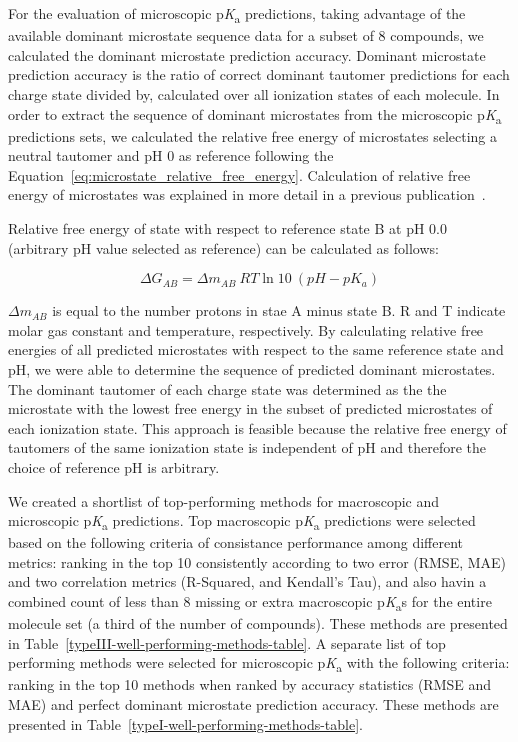 \documentclass[9pt,lineno,final]{elife}
\newcommand{\pKa}{p\textit{K}\textsubscript{a}}
\begin{document}
For the evaluation of microscopic \pKa{} predictions, taking advantage of the available dominant microstate sequence data for a subset of 8 compounds, we calculated the dominant microstate prediction accuracy. Dominant microstate prediction accuracy is the ratio of correct dominant tautomer predictions for each charge state divided by, calculated over all ionization states of each molecule. 
In order to extract the sequence of dominant microstates from the microscopic \pKa{} predictions sets, we calculated the relative free energy of microstates selecting a neutral tautomer and pH 0 as reference following the Equation~\ref{eq:microstate_relative_free_energy}. Calculation of relative free energy of microstates was explained in more detail in a previous publication~\citep{Gunner:2020:J.Comput.AidedMol.Des.}. 

Relative free energy of state with respect to reference state B at pH 0.0 (arbitrary pH value selected as reference) can be calculated as follows: 

\begin{equation}
\Delta G_{AB} = \Delta m_{AB} \:RT\ln{10}\:(pH - pK_{a})
\label{eq:microstate_relative_free_energy}
\end{equation}

$\Delta m_{AB}$ is equal to the number protons in stae A minus state B. R and T indicate molar gas constant and temperature, respectively. 
By calculating relative free energies of all predicted microstates with respect to the same reference state and pH, we were able to determine the sequence of predicted dominant microstates. 
The dominant tautomer of each charge state was determined as the the microstate with the lowest free energy in the subset of predicted microstates of each ionization state. 
This approach is feasible because the relative free energy of tautomers of the same ionization state is independent of pH and therefore the choice of reference pH is arbitrary.

We created a shortlist of top-performing methods for macroscopic and microscopic \pKa{} predictions. Top macroscopic \pKa{} predictions were selected based on the following criteria of consistance performance among different metrics: ranking in the top 10 consistently according to two error (RMSE, MAE) and two correlation metrics (R-Squared, and Kendall’s Tau), and also havin a combined count of less than 8 missing or extra macroscopic \pKa{}s for the entire molecule set (a third of the number of compounds). 
These methods are presented in Table~\ref{typeIII-well-performing-methods-table}. A separate list of top performing methods were selected for microscopic \pKa{} with the following criteria: ranking in the top 10 methods when ranked by accuracy statistics (RMSE and MAE) and perfect dominant microstate prediction accuracy. These methods are presented in Table~\ref{typeI-well-performing-methods-table}.
\end{document}
